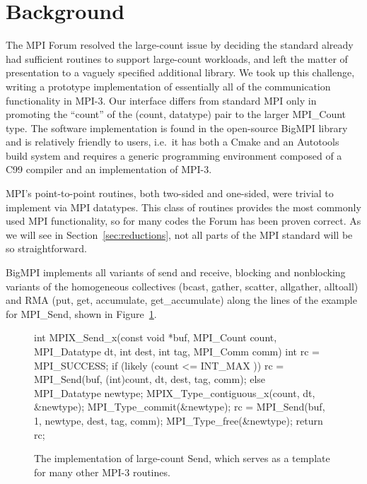 
\section{Background}

The MPI Forum resolved the large-count issue by deciding the standard already
had sufficient routines to support large-count workloads, and left the matter
of presentation to a vaguely specified additional library.  We took up this
challenge, writing a prototype implementation of
essentially all of the communication functionality in MPI-3.  Our interface
differs from standard MPI only in promoting the ``count'' of the (count,
datatype) pair to the larger MPI\_Count type.  The software implementation is
found in the open-source BigMPI
library and is relatively friendly to users, i.e.\ it has both a Cmake
and an Autotools build system and requires a generic programming
environment composed of a C99 compiler and an implementation
of MPI-3.

MPI's point-to-point routines, both two-sided and one-sided, were
trivial to implement via MPI datatypes.  This class of routines provides the
most commonly used MPI functionality, so for many codes the Forum has been
proven correct.  As we will see in Section~\ref{sec:reductions},
not all parts of the MPI
standard will be so straightforward.

BigMPI implements all variants of send and receive, blocking and nonblocking variants of
the homogeneous collectives (bcast, gather, scatter, allgather, alltoall)
and RMA (put, get, accumulate, get\_accumulate)
along the lines of the example for MPI\_Send, shown in Figure~\ref{code:mpi_send_x}.

\begin{figure}
\begin{code}
int MPIX_Send_x(const void *buf, MPI_Count count,
                MPI_Datatype dt, int dest,
                int tag, MPI_Comm comm)
{
    int rc = MPI_SUCCESS;
    if (likely (count <= INT_MAX )) {
        rc = MPI_Send(buf, (int)count, dt, dest, tag, comm);
    } else {
        MPI_Datatype newtype;
        MPIX_Type_contiguous_x(count, dt, &newtype);
        MPI_Type_commit(&newtype);
        rc = MPI_Send(buf, 1, newtype, dest, tag, comm);
        MPI_Type_free(&newtype);
    }
    return rc;
}
\end{code}
\label{code:mpi_send_x}
\caption{The implementation of large-count Send, which serves as a template
for many other MPI-3 routines.}
\end{figure}


